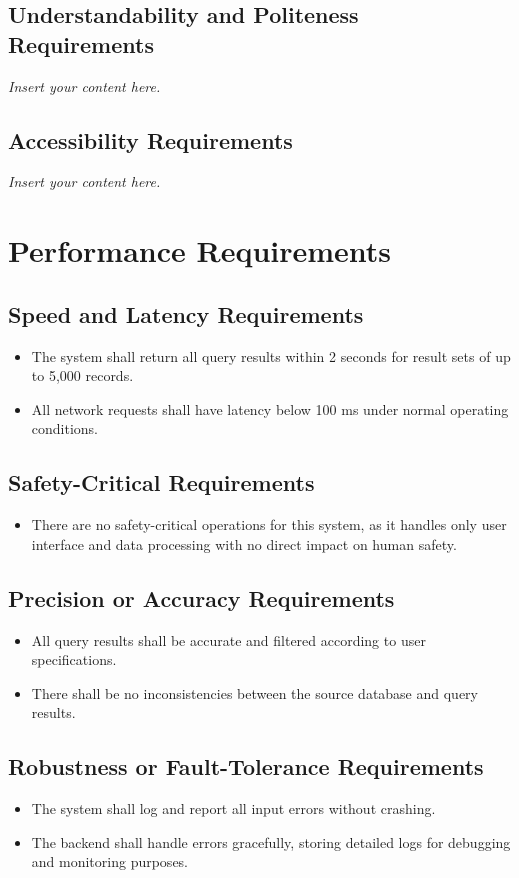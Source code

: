 \documentclass[12pt]{article}
\newcommand{\lips}{\textit{Insert your content here.}}
\begin{document}
\subsection{Understandability and Politeness Requirements}
\lips
\subsection{Accessibility Requirements}
\lips

\section{Performance Requirements}

\subsection{Speed and Latency Requirements}
\begin{itemize}
    \item The system shall return all query results within 2 seconds for result sets of up to 5,000 records.
    \item All network requests shall have latency below 100 ms under normal operating conditions.
\end{itemize}

\subsection{Safety-Critical Requirements}
\begin{itemize}
    \item There are no safety-critical operations for this system, as it handles only user interface and data processing with no direct impact on human safety.
\end{itemize}

\subsection{Precision or Accuracy Requirements}
\begin{itemize}
    \item All query results shall be accurate and filtered according to user specifications.
    \item There shall be no inconsistencies between the source database and query results.
\end{itemize}

\subsection{Robustness or Fault-Tolerance Requirements}
\begin{itemize}
    \item The system shall log and report all input errors without crashing.
    \item The backend shall handle errors gracefully, storing detailed logs for debugging and monitoring purposes.
\end{itemize}
\end{document}
